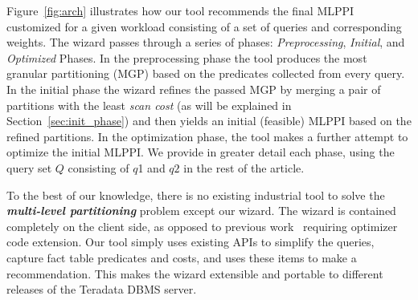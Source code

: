\documentclass[paper]{ieice}
\begin{document}
Figure~\ref{fig:arch} illustrates how our tool recommends 
the final MLPPI customized for a given workload consisting of 
a set of queries and corresponding weights. 
The wizard passes through a series of phases: {\em Preprocessing}, 
{\em Initial}, and {\em Optimized} Phases. 
In the preprocessing phase the tool produces the most granular partitioning (MGP) based on the predicates collected from every query.
In the initial phase the wizard refines the passed MGP 
by merging a pair of partitions with the least {\em scan cost} (as will be explained in \hbox{Section~\ref{sec:init_phase}}) 
and then yields an initial (feasible) MLPPI based on the refined partitions.
In the \hbox{optimization} phase, the tool makes a further attempt to optimize the initial MLPPI. 
We provide in greater \hbox{detail} each phase, 
using the query set $Q$ consisting of $q$1 and $q2$ in the rest of the article.


To the best of our knowledge, there is no existing industrial tool 
to solve the {\it {\bf multi-level partitioning}} problem except our wizard. 
The wizard is contained completely on the client side, as opposed to 
previous work~\cite{agrawal04:integrating,Lightstone04:db2auto,nehme2011automated} 
requiring optimizer code extension. 
Our tool simply uses existing APIs to simplify the queries, capture fact table 
predicates and costs, and uses these items to make a recommendation. 
This makes the wizard extensible and portable to different releases 
of the Teradata DBMS server. 
\end{document}
